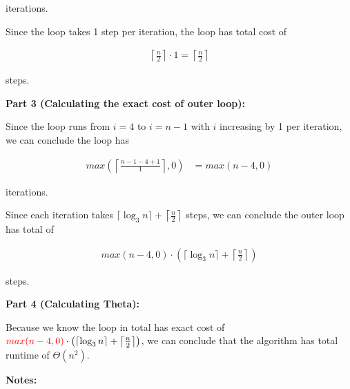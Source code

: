 \documentclass[12pt]{article}
\begin{document}
\begin{enumerate}[a.]
\begin{mdframed}
        iterations.

        \bigskip

        Since the loop takes 1 step per iteration, the loop has total cost of

        \begin{align}
            \left\lceil \frac{n}{2} \right\rceil \cdot 1 = \left\lceil \frac{n}{2} \right\rceil
        \end{align}

        steps.

        \bigskip

        \textbf{Part 3 (Calculating the exact cost of outer loop):}

        \bigskip

        Since the loop runs from $i = 4$ to $i = n - 1$ with $i$ increasing by 1 per
        iteration, we can conclude the loop has

        \color{red}
        \begin{align}
            max(\left\lceil \frac{n-1-4+1}{1} \right\rceil, 0) &= max(n - 4, 0)
        \end{align}
        \color{black}

        iterations.

        \bigskip

        Since each iteration takes $\lceil \log_3 n \rceil + \left\lceil \frac{n}{2} \right\rceil$
        steps, we can conclude the outer loop has total of

        \color{red}
        \begin{align}
            max(n-4, 0) \cdot \left( \lceil \log_3 n \rceil + \left\lceil \frac{n}{2} \right\rceil \right)
        \end{align}
        \color{black}

        steps.

        \bigskip

        \textbf{Part 4 (Calculating Theta):}

        \bigskip

        Because we know the loop in total has exact cost of $\color{red}max(n-4, 0)\color{black}
        \cdot \left( \lceil \log_3 n \rceil + \left\lceil \frac{n}{2} \right\rceil \right)$,
        we can conclude that the algorithm has total runtime of $\Theta(n^2)$.

    \end{mdframed}

    \bigskip

    \textbf{Notes:}


\end{enumerate}
\end{document}
